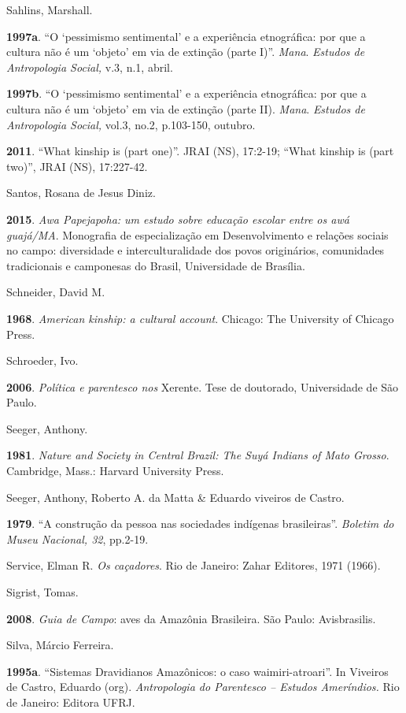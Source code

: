 Sahlins, Marshall.

\textbf{1997a}. ``O `pessimismo sentimental' e a experiência
etnográfica: por que a cultura não é um `objeto' em via de extinção
(parte I)''. \emph{Mana}. \emph{Estudos de Antropologia Social,} v.3,
n.1, abril.

\textbf{1997b}. ``O `pessimismo sentimental' e a experiência
etnográfica: por que a cultura não é um `objeto' em via de extinção
(parte II). \emph{Mana}. \emph{Estudos de Antropologia Social,} vol.3,
no.2, p.103-150, outubro.

\textbf{2011}. ``What kinship is (part one)''. JRAI (NS), 17:2-19;
``What kinship is (part two)'', JRAI (NS), 17:227-42.

Santos, Rosana de Jesus Diniz.

\textbf{2015}. \emph{Awa Papejapoha: um estudo sobre educação escolar
entre os awá guajá/MA}. Monografia de especialização em Desenvolvimento
e relações sociais no campo: diversidade e interculturalidade dos povos
originários, comunidades tradicionais e camponesas do Brasil,
Universidade de Brasília.

Schneider, David M.

\textbf{1968}. \emph{American kinship: a cultural account}. Chicago: The
University of Chicago Press.

Schroeder, Ivo.

\textbf{2006}. \emph{Política e parentesco nos} Xerente. Tese de
doutorado, Universidade de São Paulo.

Seeger, Anthony.

\textbf{1981}. \emph{Nature and Society in Central Brazil: The Suyá
Indians of Mato Grosso}. Cambridge, Mass.: Harvard University Press.

Seeger, Anthony, Roberto A. da Matta \& Eduardo viveiros de Castro.

\textbf{1979}. ``A construção da pessoa nas sociedades indígenas
brasileiras''. \emph{Boletim do Museu Nacional, 32}, pp.2-19.

Service, Elman R. \emph{Os caçadores}. Rio de Janeiro: Zahar Editores,
1971 (1966).

Sigrist, Tomas.

\textbf{2008}. \emph{Guia de Campo}: aves da Amazônia Brasileira. São
Paulo: Avisbrasilis.

Silva, Márcio Ferreira.

\textbf{1995a}. ``Sistemas Dravidianos Amazônicos: o caso
waimiri-atroari''. In Viveiros de Castro, Eduardo (org).
\emph{Antropologia do Parentesco -- Estudos Ameríndios.} Rio de Janeiro:
Editora UFRJ.

